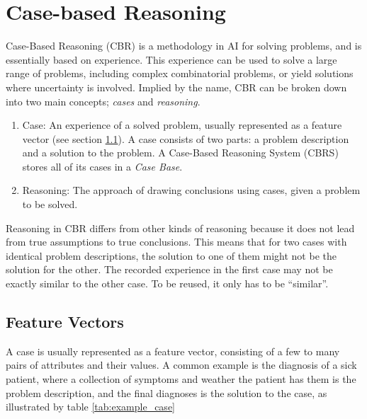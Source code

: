 \section{Case-based Reasoning}
Case-Based Reasoning (CBR) is a methodology in AI for solving problems, and is essentially based on experience. This experience can be used to solve a large range of problems, including complex combinatorial problems, or yield solutions where uncertainty is involved. \cite{richter2013case} Implied by the name, CBR can be broken down into two main concepts; \textit{cases} and \textit{reasoning}.

\begin{enumerate}
    \item Case: An experience of a solved problem, usually represented as a feature vector (see section \ref{sec:feature_vectors}). A case consists of two parts: a problem description and a solution to the problem. A Case-Based Reasoning System (CBRS) stores all of its cases in a \textit{Case Base}.
    \item Reasoning: The approach of drawing conclusions using cases, given a problem to be solved.
\end{enumerate}

Reasoning in CBR differs from other kinds of reasoning because it does not lead from true assumptions to true conclusions. This means that for two cases with identical problem descriptions, the solution to one of them might not be the solution for the other. The recorded experience in the first case may not be exactly similar to the other case. To be reused, it only has to be \enquote{similar}.

\subsection{Feature Vectors}\label{sec:feature_vectors}
A case is usually represented as a feature vector, consisting of a few to many pairs of attributes and their values. A common example is the diagnosis of a sick patient, where a collection of symptoms and weather the patient has them is the problem description, and the final diagnoses is the solution to the case, as illustrated by table \ref{tab:example_case}


